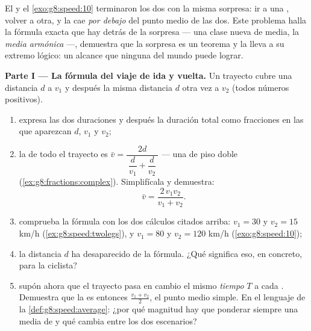 \begin{problem}
\label{pb:g8:speed:1}
El  y el \cref{exo:g8:speed:10} terminaron los dos
con la misma sorpresa: ir a una , volver a
otra, y la  cae \emph{por debajo} del punto medio de
las dos. Este problema halla la fórmula exacta que hay detrás de la sorpresa
--- una clase nueva de media, la \emph{media
armónica} ---, demuestra que la sorpresa es un
teorema y la lleva a su extremo lógico: un alcance que ninguna
 del mundo puede lograr.

\medskip
\noindent\textbf{Parte I --- La fórmula del viaje de ida y vuelta.}
Un trayecto cubre una distancia $d$ a  $v_1$ y después la misma
distancia $d$ otra vez a  $v_2$ (todos números positivos).
\begin{enumerate}
  \item expresa las dos duraciones y después la duración total como
        fracciones en las que aparezcan $d$, $v_1$ y $v_2$;
  \item la  de todo el trayecto es
        $\bar v = \dfrac{2d}{\ \dfrac{d}{v_1} + \dfrac{d}{v_2}\ }$
        --- una  de piso doble
        (\cref{ex:g8:fractions:complex}). Simplifícala y demuestra:
        \[
        \bar v = \frac{2\, v_1 v_2}{v_1 + v_2} .
        \]
  \item comprueba la fórmula con los dos cálculos citados arriba:
        $v_1 = 30$ y $v_2 = 15$ km/h
        (\cref{ex:g8:speed:twolegs}), y $v_1 = 80$ y
        $v_2 = 120$ km/h (\cref{exo:g8:speed:10});
  \item la distancia $d$ ha desaparecido de la fórmula. ¿Qué
        significa eso, en concreto, para la ciclista?
  \item supón ahora que el trayecto pasa en cambio el mismo
        \emph{tiempo} $T$ a cada . Demuestra que la  es entonces $\frac{v_1 + v_2}{2}$, el punto medio simple.
        En el lenguaje de la \cref{def:g8:speed:average}: ¿por qué
        magnitud hay que ponderar siempre una media de 
        y qué cambia entre los dos escenarios?
\end{enumerate}


\end{problem}
